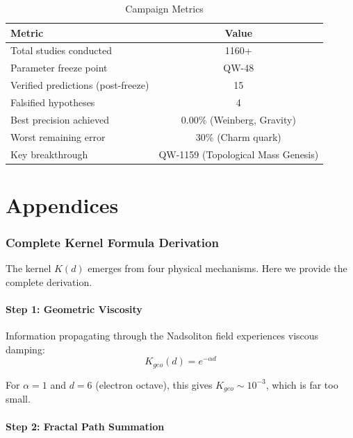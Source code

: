 \documentclass[11pt, a4paper]{article}
\theoremstyle{remark}
\begin{document}
\begin{table}[H]
\centering
\caption{Campaign Metrics}
\begin{tabular}{|l|c|}
\hline
\textbf{Metric} & \textbf{Value} \\
\hline
Total studies conducted & 1160+ \\
Parameter freeze point & QW-48 \\
Verified predictions (post-freeze) & 15 \\
Falsified hypotheses & 4 \\
Best precision achieved & 0.00\% (Weinberg, Gravity) \\
Worst remaining error & 30\% (Charm quark) \\
Key breakthrough & QW-1159 (Topological Mass Genesis) \\
\hline
\end{tabular}
\end{table}

\newpage
\part{Appendices}

\appendix

\section{Complete Kernel Formula Derivation}

The kernel $K(d)$ emerges from four physical mechanisms. Here we provide the complete derivation.

\subsection{Step 1: Geometric Viscosity}

Information propagating through the Nadsoliton field experiences viscous damping:
\begin{equation}
K_{geo}(d) = e^{-\alpha d}
\end{equation}

For $\alpha = 1$ and $d = 6$ (electron octave), this gives $K_{geo} \sim 10^{-3}$, which is far too small.

\subsection{Step 2: Fractal Path Summation}
\end{document}
